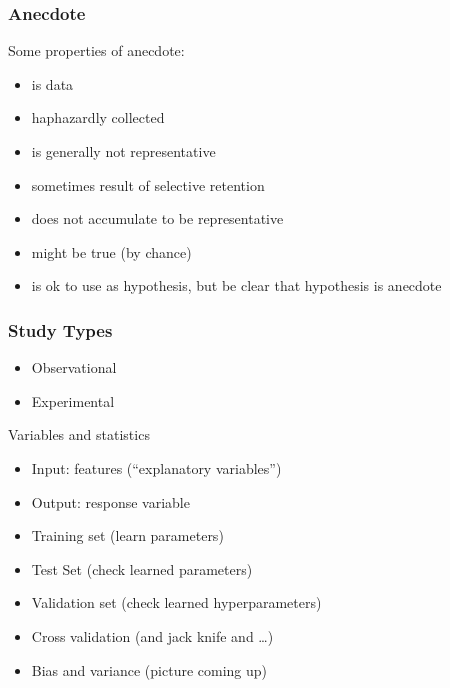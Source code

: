 \begin{frame}
  \frametitle{Anecdote}

  Some properties of anecdote:

  \begin{itemize}
  \item is data
  \item haphazardly collected
  \item is generally not representative
  \item sometimes result of selective retention
  \item does not accumulate to be representative
  \item might be true (by chance)
  \item is ok to use as hypothesis, but be clear that hypothesis is anecdote
  \end{itemize}
\end{frame}

\begin{frame}
  \frametitle{Study Types}

  \begin{itemize}
  \item Observational
  \item Experimental
  \end{itemize}

\end{frame}

\begin{frame}{Variables and statistics}
  \begin{itemize}
  \item Input: features (``explanatory variables'')
  \item Output: response variable
  \item Training set (learn parameters)
  \item Test Set (check learned parameters)
  \item Validation set (check learned hyperparameters)
  \item Cross validation (and jack knife and \dots)
  \item Bias and variance (picture coming up)
  \end{itemize}
\end{frame}

